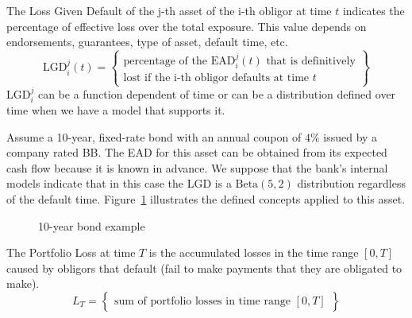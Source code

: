 \documentclass[11pt,fleqn]{book} %
\begin{document}
\begin{definition}
	The Loss Given Default of the j-th asset of the i-th obligor at time $t$ 
	indicates the percentage of effective loss over the total exposure. This
	value depends on endorsements, guarantees, type of asset, default time, etc.
	\begin{displaymath}
		\text{LGD}_i^j(t) = \left\{
		\begin{array}{c}
			\text{percentage of the $\text{EAD}_i^j(t)$ that is definitively} \\
			\text{lost if the i-th obligor defaults at time $t$}
		\end{array}
		\right\}
	\end{displaymath}
	$\text{LGD}_i^j$ can be a function dependent of time or can be a 
	distribution defined over time when we have a model that supports it. 
\end{definition}

\begin{example}
	Assume a 10-year, fixed-rate bond with an annual coupon of $4\%$ issued 
	by a company rated BB\@. The EAD for this asset can be obtained from its 
	expected cash flow because it is known in advance. We suppose that the 
	bank's internal models indicate that in this case the LGD is a 
	$\text{Beta}(5,2)$ distribution regardless of the default time.
	Figure~\ref{figure:bond} illustrates the defined concepts applied 
	to this asset.
	\begin{figure}[!ht]
		\centering
		\caption{10-year bond example}
		\label{figure:bond} 
	\end{figure}
\end{example}

\begin{definition}
	The Portfolio Loss at time $T$ is the accumulated losses in the time 
	range $[0,T]$ caused by obligors that default (fail to make payments 
	that they are obligated to make).
	\begin{displaymath}
		L_T = \left\{
		\begin{array}{c}
			\text{sum of portfolio losses in time range $[0,T]$}
		\end{array}
		\right\}
	\end{displaymath}
\end{definition}
\end{document}
